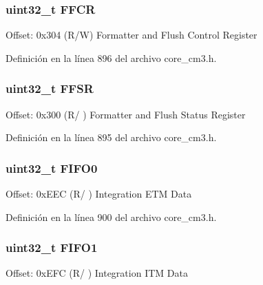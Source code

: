 \subsubsection[{\texorpdfstring{F\+F\+CR}{FFCR}}]{ uint32\+\_\+t F\+F\+CR}\hypertarget{struct_t_p_i___type_a511d496d51cf81ccef6e97fd1d5abe31}{}\label{struct_t_p_i___type_a511d496d51cf81ccef6e97fd1d5abe31}
Offset\+: 0x304 (R/W) Formatter and Flush Control Register 

Definición en la línea 896 del archivo core\+\_\+cm3.\+h.

\subsubsection[{\texorpdfstring{F\+F\+SR}{FFSR}}]{ uint32\+\_\+t F\+F\+SR}\hypertarget{struct_t_p_i___type_ab1bcdedfb12eaebecde53a7add7f9f84}{}\label{struct_t_p_i___type_ab1bcdedfb12eaebecde53a7add7f9f84}
Offset\+: 0x300 (R/ ) Formatter and Flush Status Register 

Definición en la línea 895 del archivo core\+\_\+cm3.\+h.

\subsubsection[{\texorpdfstring{F\+I\+F\+O0}{FIFO0}}]{ uint32\+\_\+t F\+I\+F\+O0}\hypertarget{struct_t_p_i___type_afaaebd439123255be4d82536f8bda272}{}\label{struct_t_p_i___type_afaaebd439123255be4d82536f8bda272}
Offset\+: 0x\+E\+EC (R/ ) Integration E\+TM Data 

Definición en la línea 900 del archivo core\+\_\+cm3.\+h.

\subsubsection[{\texorpdfstring{F\+I\+F\+O1}{FIFO1}}]{ uint32\+\_\+t F\+I\+F\+O1}\hypertarget{struct_t_p_i___type_af9289020546ed8dfae56b59506dfb29c}{}\label{struct_t_p_i___type_af9289020546ed8dfae56b59506dfb29c}
Offset\+: 0x\+E\+FC (R/ ) Integration I\+TM Data 

